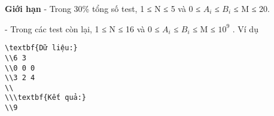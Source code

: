 \textbf{    Giới hạn   }
- Trong 30\% tổng số test, 1 ≤ N ≤ 5 và 0 ≤ $A_{i}$   ≤ $B_{i}$   ≤ M ≤ 20.  

   - Trong các test còn lại, 1 ≤ N ≤ 16 và 0 ≤ $A_{i}$   ≤ $B_{i}$   ≤ M ≤ $10^{9}$   .
   Ví dụ  
\begin{verbatim}
\textbf{Dữ liệu:}
\\6 3
\\0 0 0
\\3 2 4
\\
\\\textbf{Kết quả:}
\\9\end{verbatim}
